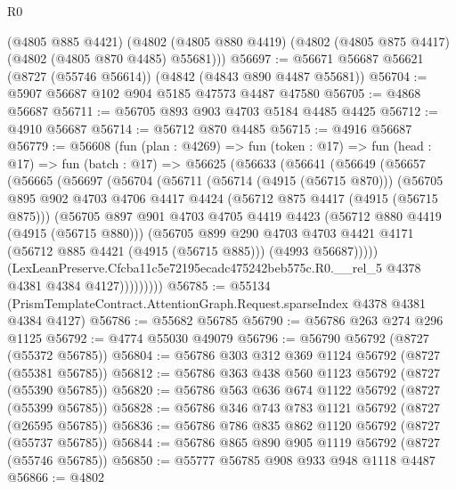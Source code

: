 \begin{lexlean}{R0}
\begin{coremodule}
    (@4805 @885 @4421)
    (@4802 (@4805 @880 @4419) (@4802 (@4805 @875 @4417) (@4802 (@4805 @870 @4485) @55681)))
@56697 := @56671 @56687 @56621 (@8727 (@55746 @56614)) (@4842 (@4843 @890 @4487 @55681))
@56704 := @5907 @56687 @102 @904 @5185 @47573 @4487 @47580
@56705 := @4868 @56687
@56711 := @56705 @893 @903 @4703 @5184 @4485 @4425
@56712 := @4910 @56687
@56714 := @56712 @870 @4485
@56715 := @4916 @56687
@56779 := @56608
    (fun (plan : @4269) =>
    fun (token : @17) =>
    fun (head : @17) =>
    fun (batch : @17) =>
    @56625
      (@56633
        (@56641
          (@56649
            (@56657
              (@56665
                (@56697
                  (@56704
                    (@56711
                      (@56714 (@4915 (@56715 @870)))
                      (@56705
                        @895
                        @902
                        @4703
                        @4706
                        @4417
                        @4424
                        (@56712 @875 @4417 (@4915 (@56715 @875)))
                        (@56705
                          @897
                          @901
                          @4703
                          @4705
                          @4419
                          @4423
                          (@56712 @880 @4419 (@4915 (@56715 @880)))
                          (@56705
                            @899
                            @290
                            @4703
                            @4703
                            @4421
                            @4171
                            (@56712 @885 @4421 (@4915 (@56715 @885)))
                            (@4993 @56687)))))
                    (LexLeanPreserve.Cfcba11c5e72195ecadc475242beb575c.R0.__rel_5
                      @4378
                      @4381
                      @4384
                      @4127)))))))))
@56785 := @55134 (PrismTemplateContract.AttentionGraph.Request.sparseIndex @4378 @4381 @4384 @4127)
@56786 := @55682 @56785
@56790 := @56786 @263 @274 @296 @1125
@56792 := @4774 @55030 @49079
@56796 := @56790 @56792 (@8727 (@55372 @56785))
@56804 := @56786 @303 @312 @369 @1124 @56792 (@8727 (@55381 @56785))
@56812 := @56786 @363 @438 @560 @1123 @56792 (@8727 (@55390 @56785))
@56820 := @56786 @563 @636 @674 @1122 @56792 (@8727 (@55399 @56785))
@56828 := @56786 @346 @743 @783 @1121 @56792 (@8727 (@26595 @56785))
@56836 := @56786 @786 @835 @862 @1120 @56792 (@8727 (@55737 @56785))
@56844 := @56786 @865 @890 @905 @1119 @56792 (@8727 (@55746 @56785))
@56850 := @55777 @56785 @908 @933 @948 @1118 @4487
@56866 := @4802

\end{coremodule}
\end{lexlean}
